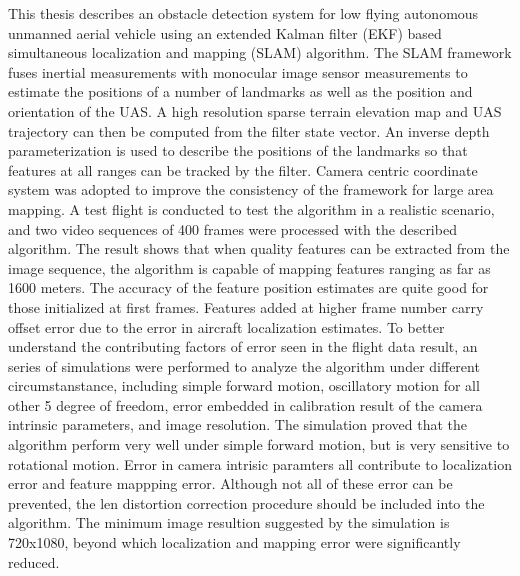 This thesis describes an obstacle detection system for low flying
autonomous unmanned aerial vehicle using an 
extended Kalman filter (EKF) based simultaneous localization and
mapping (SLAM) algorithm.
The SLAM framework fuses inertial
measurements with monocular image sensor measurements to estimate the
positions of a number of landmarks as well as the position and
orientation of the UAS. A high resolution sparse terrain elevation map
and UAS trajectory can then be computed from the filter state vector.
An inverse depth parameterization is used to describe the positions of
the landmarks so that features at all ranges can be tracked by the
filter. Camera centric coordinate system was adopted to improve the
consistency of the framework for large area mapping. A test flight is
conducted to test the algorithm in a realistic scenario, and two video
sequences of 400 frames were processed with the described algorithm.
The result shows that when quality features can be extracted from the
image sequence, the algorithm is capable of mapping features ranging
as far as 1600 meters. The accuracy of the feature position estimates
are quite good for those initialized at first frames. Features added
at higher frame number carry offset error due to the error in aircraft
localization estimates. To better understand the contributing factors
of error seen in the flight data result, an series of simulations were
performed to analyze the algorithm under different circumstanstance,
including simple forward motion, oscillatory motion for all
other 5 degree of freedom, error embedded in calibration result of the
camera intrinsic parameters, and image resolution. The simulation
proved that the algorithm perform very well under simple forward
motion, but is very sensitive to rotational motion. Error in camera
intrisic paramters all contribute to localization error and feature
mappping error. Although not all of these error can be prevented, the
len distortion correction procedure should be included into the
algorithm.  The minimum image resultion suggested by the
simulation is 720x1080, beyond which localization and mapping error
were significantly reduced. 
